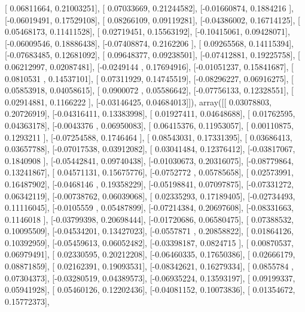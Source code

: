 \documentclass{article}
\begin{document}
       [ 0.06811664,  0.21003251],
       [ 0.07033669,  0.21244582],
       [-0.01660874,  0.1884216 ],
       [-0.06019491,  0.17529108],
       [ 0.08266109,  0.09119281],
       [-0.04386002,  0.16714125],
       [ 0.05468173,  0.11411528],
       [ 0.02719451,  0.15563192],
       [-0.10415061,  0.09428071],
       [-0.06009546,  0.18886438],
       [-0.07408874,  0.2162206 ],
       [ 0.09265568,  0.14115394],
       [-0.07683485,  0.12681092],
       [ 0.09648377,  0.09238501],
       [-0.07412881,  0.19225758],
       [ 0.06212997,  0.02087481],
       [-0.0249144 ,  0.17694916],
       [-0.01051237,  0.15841687],
       [ 0.0810531 ,  0.14537101],
       [ 0.07311929,  0.14745519],
       [-0.08296227,  0.06916275],
       [ 0.05853918,  0.04058615],
       [ 0.0900072 ,  0.05586642],
       [-0.07756133,  0.12328551],
       [ 0.02914881,  0.1166222 ],
       [-0.03146425,  0.04684013]]), array([[ 0.03078803,  0.20726919],
       [-0.04316411,  0.13383998],
       [ 0.01927411,  0.04648688],
       [ 0.01762595,  0.04363178],
       [-0.0043376 ,  0.06950083],
       [ 0.06415376,  0.11953057],
       [ 0.00110875,  0.1293211 ],
       [-0.07254588,  0.1746464 ],
       [ 0.08543031,  0.17331395],
       [ 0.03686413,  0.03657788],
       [-0.07017538,  0.03912082],
       [ 0.03041484,  0.12376412],
       [-0.03817067,  0.1840908 ],
       [-0.05442841,  0.09740438],
       [-0.01030673,  0.20316075],
       [-0.08779864,  0.13241867],
       [ 0.04571131,  0.15675776],
       [-0.0752772 ,  0.05785658],
       [ 0.02573991,  0.16487902],
       [-0.0468146 ,  0.19358229],
       [-0.05198841,  0.07097875],
       [-0.07331272,  0.06342119],
       [-0.00738762,  0.06039068],
       [ 0.02335293,  0.17189405],
       [-0.02734493,  0.11116045],
       [-0.0105559 ,  0.05487899],
       [-0.07214384,  0.20697608],
       [-0.08331663,  0.1146018 ],
       [-0.03799398,  0.20698444],
       [-0.01720686,  0.06580475],
       [ 0.07388532,  0.10095509],
       [-0.04534201,  0.13427023],
       [-0.0557871 ,  0.20858822],
       [ 0.01864126,  0.10392959],
       [-0.05459613,  0.06052482],
       [-0.03398187,  0.0824715 ],
       [ 0.00870537,  0.06979491],
       [ 0.02330595,  0.20212208],
       [-0.06460335,  0.17650386],
       [ 0.02666179,  0.08871859],
       [ 0.02162391,  0.19093531],
       [-0.08342621,  0.16279334],
       [ 0.0855784 ,  0.07304373],
       [-0.03280519,  0.04389573],
       [-0.06935224,  0.13593197],
       [ 0.09199337,  0.05941928],
       [ 0.05460126,  0.12202436],
       [-0.04081152,  0.10073836],
       [ 0.01354672,  0.15772373],
\end{document}
